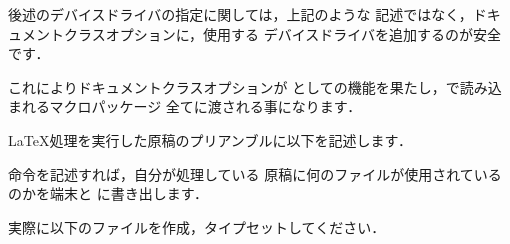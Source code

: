 {{{{{\begin{Trick}
 後述のデバイスドライバの指定に関しては，上記のような
 記述ではなく，ドキュメントクラスオプションに，使用する
 デバイスドライバを追加するのが安全です．


これによりドキュメントクラスオプションが
としての機能を果たし，で読み込まれるマクロパッケージ
全てに渡される事になります．
\end{Trick}


{\LaTeX}処理を実行した原稿のプリアンブルに以下を記述します．

\begin{Syntax}
\end{Syntax}

命令を記述すれば，自分が処理している
原稿に何のファイルが使用されているのかを端末と
に書き出します．

\begin{Prob}
実際に以下のファイルを作成，タイプセットしてください．



\begin{comment}
\begin{OutTerm}
This is pTeX, Version 3.14159-p3.1.5 (euc) (Web2C 7.4.5)
(./filetest.tex
pLaTeX2e <2005/01/04>+0 (based on LaTeX2e <2001/06/01> patch level 0)
(/usr/local/share/texmf/ptex/platex/base/jarticle.cls
Document Class: jarticle 2002/04/09 v1.4 Standard pLaTeX class
(/usr/local/share/texmf/ptex/platex/base/jsize10.clo)) 
(./filetest.aux) [1] (./filetest.aux)


\end{comment}
\end{Prob}}}}}}
